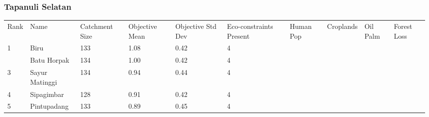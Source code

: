 \subsubsection{Tapanuli Selatan}
\begin{table}[ht]
\centering
\begingroup\fontsize{8pt}{9pt}\selectfont
\begin{tabular}{C{0.03\textwidth}C{0.12\textwidth}C{0.09\textwidth}C{0.08\textwidth}C{0.08\textwidth}C{0.08\textwidth}C{0.07\textwidth}C{0.07\textwidth}C{0.07\textwidth}C{0.07\textwidth}}
 Rank & Name & Catchment Size & Objective Mean & Objective Std Dev & Eco-constraints  Present & Human Pop & Croplands & Oil Palm & Forest Loss \\ 
 {1} & Biru & 133 & \textcolor[HTML]{FFFFFF}{1.08} & \textcolor[HTML]{000000}{0.42} & \textcolor[HTML]{FFFFFF}{4} &  &  &  &  \\ 
   & Batu Horpak & 134 & \textcolor[HTML]{FFFFFF}{1.00} & \textcolor[HTML]{000000}{0.42} & \textcolor[HTML]{FFFFFF}{4} &  &  &  &  \\ 
  {3} & Sayur Matinggi & 134 & \textcolor[HTML]{000000}{0.94} & \textcolor[HTML]{FFFFFF}{0.44} & \textcolor[HTML]{FFFFFF}{4} &  &  &  &  \\ 
  {4} & Sipagimbar & 128 & \textcolor[HTML]{000000}{0.91} & \textcolor[HTML]{000000}{0.42} & \textcolor[HTML]{FFFFFF}{4} &  &  &  &  \\ 
  {5} & Pintupadang & 133 & \textcolor[HTML]{000000}{0.89} & \textcolor[HTML]{FFFFFF}{0.45} & \textcolor[HTML]{FFFFFF}{4} &  &  &  &  \\ 

\end{tabular}
\end{table}
